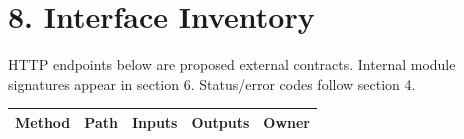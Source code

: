 \clearpage
\section{8. Interface Inventory}\label{interface-inventory}

HTTP endpoints below are proposed external contracts. Internal module signatures appear in section 6. Status/error codes follow section 4.

{\def\LTcaptype{none} %
\begin{longtable}[]{|
  >{\raggedright\arraybackslash}m{}|
  >{\raggedright\arraybackslash}m{}|
  >{\raggedright\arraybackslash}m{}|
  >{\raggedright\arraybackslash}m{}|
  >{\raggedright\arraybackslash}m{}|}
\hline
\begin{minipage}[c]{\linewidth}\raggedright
\textbf{Method}
\end{minipage} & \begin{minipage}[c]{\linewidth}\raggedright
\textbf{Path}
\end{minipage} & \begin{minipage}[c]{\linewidth}\raggedright
\textbf{Inputs}
\end{minipage} & \begin{minipage}[c]{\linewidth}\raggedright
\textbf{Outputs}
\end{minipage} & \begin{minipage}[c]{\linewidth}\raggedright
\textbf{Owner}
\end{minipage} \\
\hline
\endhead


\end{longtable}}

